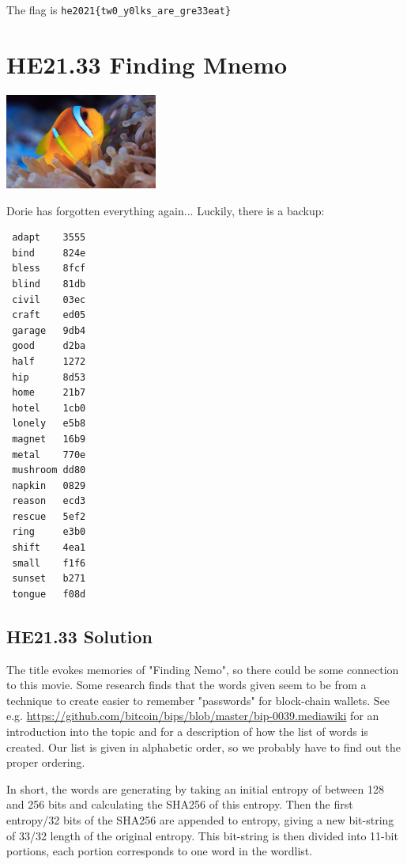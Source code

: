\documentclass[english,a4paper,nols,noindent]{tufte-handout}
\begin{document}
\noindent The flag is \verb+he2021{tw0_y0lks_are_gre33eat}+

\hypertarget{he21.33}{%
\section{HE21.33 Finding Mnemo}
  \label{he21.33}}
\begin{marginfigure}
    \includegraphics[width=50mm]{images/challenge33.jpg}
\end{marginfigure}

\noindent Dorie has forgotten everything again... Luckily, there is a backup:

\begin{verbatim} 
 adapt    3555  
 bind     824e  
 bless    8fcf  
 blind    81db  
 civil    03ec  
 craft    ed05  
 garage   9db4  
 good     d2ba  
 half     1272   
 hip      8d53  
 home     21b7  
 hotel    1cb0  
 lonely   e5b8  
 magnet   16b9  
 metal    770e  
 mushroom dd80  
 napkin   0829  
 reason   ecd3  
 rescue   5ef2  
 ring     e3b0  
 shift    4ea1  
 small    f1f6  
 sunset   b271  
 tongue   f08d  
\end{verbatim} 


\hypertarget{he21.33-solution}{%
\subsection{HE21.33 Solution}\label{he21.33-solution}}

\noindent The title evokes memories of "Finding Nemo", so there could be some
connection to this movie.  Some research finds that the words given seem to be
from a technique to create easier to remember "passwords" for block-chain
wallets.  See e.g.
\url{https://github.com/bitcoin/bips/blob/master/bip-0039.mediawiki} for an
introduction into the topic and for a description of how the list of words is
created.  Our list is given in alphabetic order, so we probably have to find out
the proper ordering.

In short, the words are generating by taking an initial entropy of between 128
and 256 bits and calculating the
SHA256 of this entropy. Then the first entropy/32 bits of the SHA256 are
appended to entropy, giving a new bit-string of 33/32 length of the original
entropy.  This bit-string is then divided into 11-bit portions, each portion
corresponds to one word in the wordlist.
\end{document}
